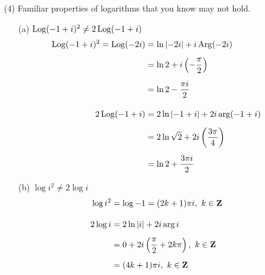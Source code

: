 \begin{example}
\begin{itemize}
\item[(4)] Familiar properties of logarithms that you know may not hold.
\begin{itemize}
\item[(a)] $\operatorname{Log}(-1 + i)^2 \neq 2\operatorname{Log} (-1 + i)$
\begin{align*}
\operatorname{Log}(-1 + i)^2 = \operatorname{Log}(-2i) &= \ln\left\lvert-2i\right\rvert + i\operatorname{Arg}(-2i)\\[0.5em]
&= \ln 2 + i\left(-\dfrac{\pi}{2}\right)\\[0.5em]
&= \ln 2 - \dfrac{\pi i}{2}\\[1em]
2\operatorname{Log} (-1 + i) &= 2\ln\left\lvert-1 + i\right\rvert + 2i\arg(-1 + i)\\[0.5em]
&= 2\ln\sqrt{2} + 2i\left(\dfrac{3\pi}{4}\right)\\[0.5em]
&= \ln 2 + \dfrac{3\pi i}{2}
\end{align*}
\item[(b)] $\log i^2 \neq 2\log i$
\begin{align*}
\log i^2 &= \log -1 = (2k+1)\pi i,\ k \in \mathbf Z\\[1em]
2\log i &= 2\ln\left\lvert i\right\rvert + 2i\arg i\\[0.5em]
&= 0 + 2i\left(\dfrac{\pi}{2} + 2k\pi\right),\ k \in \mathbf Z\\[0.5em]
&= (4k + 1)\pi i,\ k \in \mathbf Z
\end{align*}
\end{itemize}
\end{itemize}
\end{example}

\vspace*{1em}

